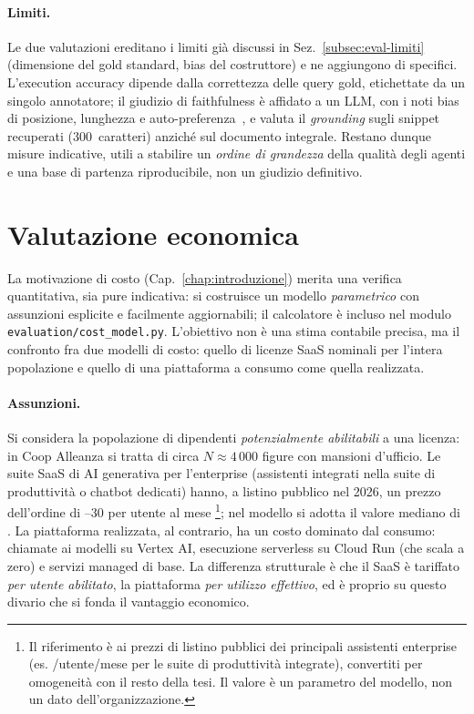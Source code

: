 \paragraph{Limiti.} Le due valutazioni ereditano i limiti già discussi in Sez.~\ref{subsec:eval-limiti} (dimensione del gold standard, bias del costruttore) e ne aggiungono di specifici. 
L'execution accuracy dipende dalla correttezza delle query gold, etichettate da un singolo annotatore; il giudizio di faithfulness è affidato a un LLM, 
con i noti bias di posizione, lunghezza e auto-preferenza~\cite{zheng2023llmjudge}, e valuta il \emph{grounding} sugli snippet recuperati (300~caratteri) 
anziché sul documento integrale. Restano dunque misure indicative, utili a stabilire un \emph{ordine di grandezza} della qualità degli agenti e una base di partenza riproducibile, 
non un giudizio definitivo.

\section{Valutazione economica}
\label{sec:eval-costi}

La motivazione di costo (Cap.~\ref{chap:introduzione}) merita una verifica quantitativa, sia pure indicativa:
si costruisce un modello \emph{parametrico} con assunzioni esplicite e facilmente aggiornabili;
il calcolatore è incluso nel modulo \texttt{evaluation/cost\_model.py}.
L'obiettivo non è una stima contabile precisa, ma il confronto fra due modelli di costo: quello di licenze SaaS nominali per l'intera popolazione
e quello di una piattaforma a consumo come quella realizzata.

\paragraph{Assunzioni.} Si considera la popolazione di dipendenti \emph{potenzialmente abilitabili} a una licenza: in Coop Alleanza si tratta di circa $N \approx 4\,000$ figure con mansioni d'ufficio. 
Le suite SaaS di AI generativa per l'enterprise
(assistenti integrati nella suite di produttività o chatbot dedicati) hanno, a listino pubblico nel 2026, un prezzo dell'ordine di --30 per utente al mese
\footnote{Il riferimento è ai prezzi di listino pubblici dei principali assistenti enterprise (es. /utente/mese per le suite di produttività integrate), 
convertiti per omogeneità con il resto della tesi. Il valore è un parametro del modello, non un dato dell'organizzazione.}; nel modello si adotta il valore mediano di .
La piattaforma realizzata, al contrario, ha un costo dominato dal consumo: chiamate ai modelli su Vertex AI,
esecuzione serverless su Cloud Run (che scala a zero) e servizi managed di base. 
La differenza strutturale è che il SaaS è tariffato \emph{per utente abilitato}, la piattaforma \emph{per utilizzo effettivo}, ed è proprio su questo divario
che si fonda il vantaggio economico.

